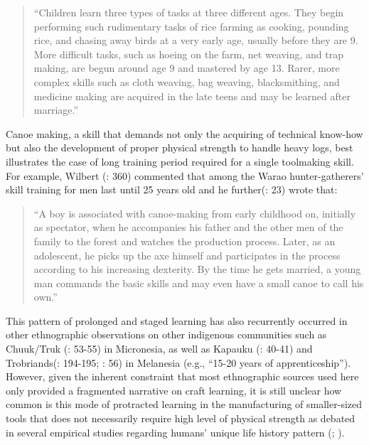 \documentclass[
  11pt,
]{article}
\begin{document}
\begin{quote}
``Children learn three types of tasks at three different ages. They begin performing such rudimentary tasks of rice farming as cooking, pounding rice, and chasing away birds at a very early age, usually before they are 9. More difficult tasks, such as hoeing on the farm, net weaving, and trap making, are begun around age 9 and mastered by age 13. Rarer, more complex skills such as cloth weaving, bag weaving, blacksmithing, and medicine making are acquired in the late teens and may be learned after marriage.''
\end{quote}

Canoe making, a skill that demands not only the acquiring of technical know-how but also the development of proper physical strength to handle heavy logs, best illustrates the case of long training period required for a single toolmaking skill. For example, Wilbert (: 360) commented that among the Warao hunter-gatherers' skill training for men last until 25 years old and he further(: 23) wrote that:

\begin{quote}
``A boy is associated with canoe-making from early childhood on, initially as spectator, when he accompanies his father and the other men of the family to the forest and watches the production process. Later, as an adolescent, he picks up the axe himself and participates in the process according to his increasing dexterity. By the time he gets married, a young man commands the basic skills and may even have a small canoe to call his own.''
\end{quote}

This pattern of prolonged and staged learning has also recurrently occurred in other ethnographic observations on other indigenous communities such as Chuuk/Truk (: 53-55) in Micronesia, as well as Kapauku (: 40-41) and Trobriands(: 194-195; : 56) in Melanesia (e.g., ``15-20 years of apprenticeship''). However, given the inherent constraint that most ethnographic sources used here only provided a fragmented narrative on craft learning, it is still unclear how common is this mode of protracted learning in the manufacturing of smaller-sized tools that does not necessarily require high level of physical strength as debated in several empirical studies regarding humans' unique life history pattern (; ).
\end{document}
